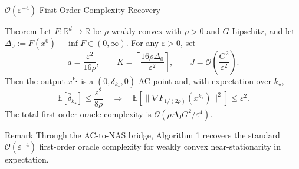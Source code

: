 \documentclass[10pt]{beamer}
\begin{document}
\begin{frame}{ $\mathcal O(\varepsilon^{-4})$ First-Order Complexity Recovery}
\scriptsize
\setlength{\abovedisplayskip}{2pt}
\setlength{\belowdisplayskip}{2pt}


\begin{block}{Theorem}
Let $F:\mathbb R^d\to\mathbb R$ be $\rho$-weakly convex with $\rho>0$
and $G$-Lipschitz, and let $\Delta_0:=F(x^0)-\inf F\in(0,\infty)$.
For any $\varepsilon>0$, set
\[
    a=\frac{\varepsilon^2}{16\rho},
    \qquad
    K=\left\lceil\frac{16\rho\Delta_0}{\varepsilon^2}\right\rceil,
    \qquad
    J=\mathcal O\!\left(\frac{G^2}{\varepsilon^2}\right).
\]
Then the output $x^{k_\star}$ is a
$(0,\bar\delta_{k_\star},0)$-AC point and, with expectation over $k_\star$,
\[
    \mathbb E\!\left[\bar\delta_{k_\star}\right]
    \le \frac{\varepsilon^2}{8\rho}
    \quad\Longrightarrow\quad
    \mathbb E\!\left[
        \bigl\|\nabla F_{1/(2\rho)}(x^{k_\star})\bigr\|^2
    \right]
    \le \varepsilon^2.
\]
The total first-order oracle complexity is
$\mathcal O(\rho\Delta_0G^2/\varepsilon^4)$.
\end{block}

\begin{alertblock}{Remark}
Through the AC-to-NAS bridge, Algorithm 1 recovers the standard
$\mathcal O(\varepsilon^{-4})$ first-order oracle complexity for weakly convex
near-stationarity in expectation.\footnotemark
\end{alertblock}

\vfill
{}

\end{frame}
\end{document}
